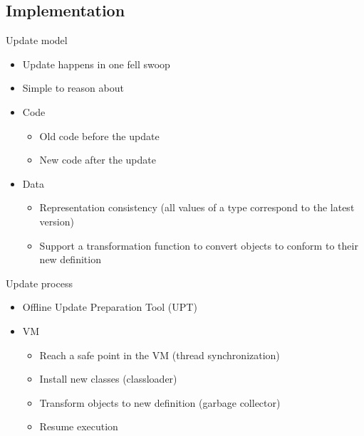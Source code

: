 

\subsection{Implementation}
\ShowTOC

\begin{frame}{Update model}%
\begin{itemize}
\item Update happens in one fell swoop
\item Simple to reason about
\item Code
  \begin{itemize}
  \item Old code before the update
  \item New code after the update
  \end{itemize}
\item Data
  \begin{itemize}
  \item Representation consistency (all values of a type correspond to the
        latest version)
  \item Support a transformation function to convert objects to conform to
        their new definition
  \end{itemize}
\end{itemize}
\end{frame}

\begin{frame}[t,fragile]{Update process}%
\JvolveTimeLine{}{}{}{}{}
\begin{itemize}
\item Offline Update Preparation Tool (UPT)
\item \DSU{} VM
  \begin{itemize}
  \item Reach a safe point in the VM (thread synchronization)
  \item Install new classes (classloader)
  \item Transform objects to new definition (garbage collector)
  \item Resume execution
  \end{itemize}
\end{itemize}
\end{frame}

